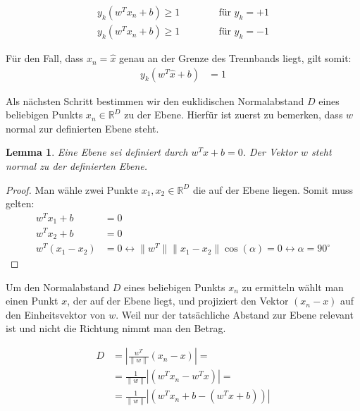 \documentclass[a4paper,11pt,twoside]{scrreprt}
\newtheorem{lemma}[theorem]{Lemma}
\newcommand{\norm}[1]{\lVert#1\rVert}
\begin{document}
\begin{subequations} \label{decision_rules2}
	\begin{alignat}{2}
		y_{k} (w^{T} x_{n} + b) \geq 1 & \qquad & \text{ für } y_{k} = +1\\
		y_{k} (w^{T} x_{n} + b) \geq 1 & & \text{ für } y_{k} = -1
	\end{alignat}
\end{subequations}



Für den Fall, dass $x_{n} = \hat{x}$ genau an der Grenze des Trennbands liegt, gilt somit:
\begin{equation} \label{dec_rule}
	\begin{aligned}
		y_{k} (w^{T} \hat{x} + b) &= 1
	\end{aligned}
\end{equation}


Als nächsten Schritt bestimmen wir den euklidischen Normalabstand $D$ eines beliebigen Punkts $x_{n} \in \mathbb{R}^{D}$ zu der Ebene. Hierfür ist zuerst zu bemerken, dass $w$ normal zur definierten Ebene steht.

\begin{lemma}
	Eine Ebene sei definiert durch $w^{T} x + b = 0$. Der Vektor $w$ steht normal zu der definierten Ebene.
\end{lemma}

\begin{proof}
	Man wähle zwei Punkte $x_{1}, x_{2} \in \mathbb{R}^{D}$ die auf der Ebene liegen. Somit muss gelten:
	\begin{equation}
		\begin{aligned}
			w^{T} x_{1} + b &= 0 \\
			w^{T} x_{2} + b &= 0 \\
			w^{T} (x_{1} - x_{2}) &= 0 \leftrightarrow \norm{w^{T}} \norm{x_{1} - x_{2}} \cos(\alpha) = 0 \leftrightarrow \alpha = 90^{\circ}
		\end{aligned}
	\end{equation}
\end{proof}

Um den Normalabstand $D$ eines beliebigen Punkts $x_{n}$ zu ermitteln wählt man einen Punkt $x$, der auf der Ebene liegt, und projiziert den Vektor $(x_{n} - x)$ auf den Einheitsvektor von $w$. Weil nur der tatsächliche Abstand zur Ebene relevant ist und nicht die Richtung nimmt man den Betrag.

\begin{equation} \label{distance_to_plane}
	\begin{aligned}
		D &= | \frac{w^{T}}{\lVert w \rVert} (x_{n} - x) | = \\
		&= \frac{1}{\norm{w}} | (w^{T} x_{n} - w^{T} x) | =\\
		&= \frac{1}{\norm{w}} | (w^{T} x_{n} + b - (w^{T} x + b)) |
	\end{aligned}
\end{equation}
\end{document}
